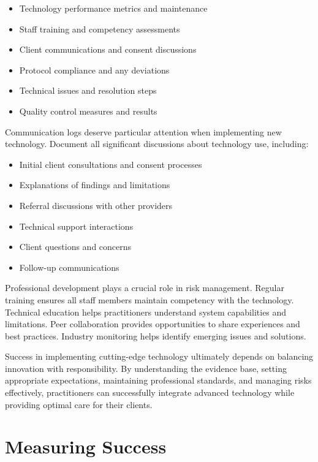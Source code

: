 \documentclass[
  Letterpaper,
]{scrbook}
\providecommand{\tightlist}{%
  \setlength{\itemsep}{0pt}\setlength{\parskip}{0pt}}\usepackage{longtable,booktabs,array}
\begin{document}
\begin{itemize}
\tightlist
\item
  Technology performance metrics and maintenance
\item
  Staff training and competency assessments
\item
  Client communications and consent discussions
\item
  Protocol compliance and any deviations
\item
  Technical issues and resolution steps
\item
  Quality control measures and results
\end{itemize}

Communication logs deserve particular attention when implementing new
technology. Document all significant discussions about technology use,
including:

\begin{itemize}
\tightlist
\item
  Initial client consultations and consent processes
\item
  Explanations of findings and limitations
\item
  Referral discussions with other providers
\item
  Technical support interactions
\item
  Client questions and concerns
\item
  Follow-up communications
\end{itemize}

Professional development plays a crucial role in risk management.
Regular training ensures all staff members maintain competency with the
technology. Technical education helps practitioners understand system
capabilities and limitations. Peer collaboration provides opportunities
to share experiences and best practices. Industry monitoring helps
identify emerging issues and solutions.

Success in implementing cutting-edge technology ultimately depends on
balancing innovation with responsibility. By understanding the evidence
base, setting appropriate expectations, maintaining professional
standards, and managing risks effectively, practitioners can
successfully integrate advanced technology while providing optimal care
for their clients.

\section{Measuring Success}\label{measuring-success}
\end{document}
